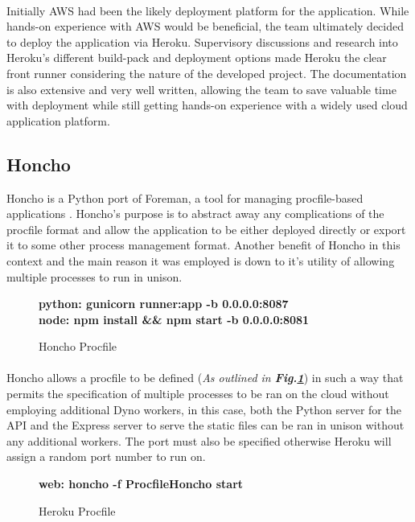 \paragraph{}
Initially AWS had been the likely deployment platform for the application. While hands-on experience with AWS would be beneficial, the team ultimately decided to deploy the application via Heroku. Supervisory discussions and research into Heroku's different build-pack and deployment options made Heroku the clear front runner considering the nature of the developed project. The documentation is also extensive and very well written, allowing the team to save valuable time with deployment while still getting hands-on experience with a widely used cloud application platform.

\subsection{Honcho}
Honcho is a Python port of Foreman, a tool for managing procfile-based applications \cite{HONCHO}. Honcho's purpose is to abstract away any complications of the procfile format and allow the application to be either deployed directly or export it to some other process management format. Another benefit of Honcho in this context and the main reason it was employed is down to it's utility of allowing multiple processes to run in unison.

\begin{figure}[H]
    \centering
    \textbf{python: gunicorn runner:app -b 0.0.0.0:8087\\ node: npm install \&\& npm start -b 0.0.0.0:8081}
    \caption{Honcho Procfile}
    \label{image:honchoProcfile}
\end{figure}

\paragraph{}
Honcho allows a procfile to be defined (\textit{As outlined in \textbf{Fig.\ref{image:honchoProcfile}}}) in such a way that permits the specification of multiple processes to be ran on the cloud without employing additional Dyno workers, in this case, both the Python server for the API and the Express server to serve the static files can be ran in unison without any additional workers. The port must also be specified otherwise Heroku will assign a random port number to run on.

\begin{figure}[H]
    \centering
    \textbf{web: honcho -f ProcfileHoncho start}
    \caption{Heroku Procfile}
    \label{image:herokuProcfile}
\end{figure}

